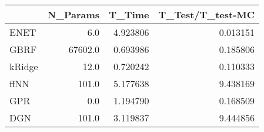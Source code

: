\begin{tabular}{lrrr}
\toprule
{} &  N\_Params &    T\_Time &  T\_Test/T\_test-MC \\
\midrule
ENET   &       6.0 &  4.923806 &          0.013151 \\
GBRF   &   67602.0 &  0.693986 &          0.185806 \\
kRidge &      12.0 &  0.720242 &          0.110333 \\
ffNN   &     101.0 &  5.177638 &          9.438169 \\
GPR    &       0.0 &  1.194790 &          0.168509 \\
DGN    &     101.0 &  3.119837 &          9.444856 \\
\bottomrule
\end{tabular}
